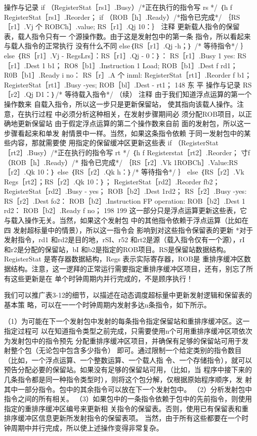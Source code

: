 操作与记录
if （RegisterStat［rs1］.Busy）/*正在执行的指令写 rs */
｛h f RegisterStat［rs1］.Reorder；
if （ROB［h］.Ready）/*指令已完成*/
｛RS［r1］.Vj 个 ROBCh］.value; RS［r1］.Qj 10：｝
注释
更新载人指令的保留表，载人指令只有一
个源操作数。由于这是发射包中的第一条
指令，所以看起来与载人指令的正常执行
没有什么不同
else｛RS［r1］.Qj -h；｝ /* 等待指令*/
｝ else ｛RS［r1］.Vj - RegsLrs］：RS［r1］.Qj - 0：｝：
RS［r1］.Busy 1 yes: RS［r1］.Dest 1 b1；
RO8［b1］.Instruction 1 Load; ROB［b1］.Dest f rd1；
R0B［b1］.Ready i no：
RS［r］.A 个 inml: RegisterStat［rt1］.Reorder f b1；
RegisterStat［rt1］.Busy -yes; ROB［bl］.Dest - rt1；
148
东 平
操作与记录
RS［r2］.Qj D1：｝/* 等待载入指令*/
（续）
注释
由于我们知道浮点运算的第一个操作数来
自载入指令，所以这一步只是更新保留站，
使其指向该载人操作。注意，在执行过程
中必须分析这种相关，在发射步骤期间必
须分配ROB项目，以正确地更新保留站
由于假定浮点运算的第二个操作数来自前
面的发射包，所以这一步骤看起来和单发
射情景中一样。当然，如果这条指令依赖
于同一发射包中的某些内容，那就需要使
用指定的保留缓冲区更新这些表
if （RegisterStat［rt2］.Busy）/*正在执行的指令写 rt */
｛h f Registerstat［rt2］.Reorder；
寸f （ROB［h］.Ready）/* 指令已完成*/
｛RS［r2］.Vk 1ROBCh］.Value:RS［r2］.Qk 10：｝
else ｛RS［r2］.Qk h：｝/* 等待指令*/
｝ else ｛RS［r2］.Vk Regs［rt2］；RS［r2］.Qk 10：｝；
RegisterStat［rd2］.Reorder fb2；
RegisterStat［rd2］.Busy - yes；
ROB［b2］.Dest 1rd2；
RS［r2］.Busy -yes: RS［r2］.Dest fo2：
ROB［b2］.Instruction  FP operation: ROB［b2］.Dest 1 rd2：
ROB［b2］.Ready f no；
198
199
这一部分只是浮点运算更新这些表，它
与载入操作无关。当然，如果这个发射包
中的其他指令依赖于浮点运算（比如在四
发射超标量中的情景），所以这一指令会
影响到对这些指令保留表的更新
*对于发射指令，rd1 和rd2是目的地，rSI、r52 和rt2是源（载入指令仅有一个源），rI 和r2是分配的保留站，bI
和b2是指定的ROB项目。RS是保留站数据结构。RegisterStat 是寄存器数据結构，Regs 表示实际寄存器，ROB是
重排序缓冲区数据结构。注意，这一逻拜的正常运行需要指定重排序缓冲区项目，还有，别忘了所有这些更新是在
单个时钟周期内并行完成的，不是顾序执行！

我们可以推广表3-12的细节，以描述在动态调度超标量中更新发射逻辑和保留表的基本策
略，可以在一一个时钟周期内发射多达n条指令，如下所示。

（1）为可能在下一个发射包中发射的每条指令指定保留站和重排序缓冲区。这一指定过程可
以在知道指令类型之前完成，只需要使用n个可用重排序缓冲区项依次为发射包中的指令预先
分配重排序缓冲区项目，并确保有足够的保留站可用于发射整个包（无论包中包含多少指令）
即可。通过限制一个给定类别的指令数目（比如，一个浮点运算、一个整数运算、一个载人指
令、一个存储指令），就可以预告分配必要的保留站。如果没有足够的保留站可用，（比如，当
程序中接下来的几条指令都是同一种指令类型时），则将这个包分解，仅根据原始程序顺序，发
射其中一部分指令。包中的其余指令可以放在下一个发射包中。
（2）分析发射包中指令之间的所有相关。
（3）如果包中的一条指令依赖于包中的先前指令，则使用指定的重排序缓冲区编号来更新相
关指令的保留表。否则，使用已有保留表和重排序缓冲区信息更新所发射指令的保留表项。
当然，由于所有这些都要在一个时钟周期中并行完成，所以使上述操作变得非常复杂。

